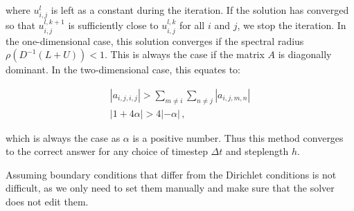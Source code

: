 \documentclass[reprint,english,notitlepage]{revtex4-1}  %
\begin{document}
where $u_{i,j}^l$ is left as a constant during the iteration. If the solution has converged so that $u_{i,j}^{l,k+1}$ is sufficiently close to $u_{i,j}^{l,k}$ for all $i$ and $j$, we stop the iteration. In the one-dimensional case, this solution converges if the spectral radius $\rho(D^{-1}(L+U)) < 1$. This is always the case if the matrix $A$ is diagonally dominant. In the two-dimensional case, this equates to:

\begin{align*}
|a_{i,j,i,j}| > \sum\limits_{m\neq i} \sum\limits_{n\neq j} |a_{i,j,m,n}| \\
|1 + 4 \alpha| > 4|-\alpha| \, ,
\end{align*}

which is always the case as $\alpha$ is a positive number. Thus this method converges to the correct answer for any choice of timestep $\Delta t$ and steplength $h$.

Assuming boundary conditions that differ from the Dirichlet conditions is not difficult, as we only need to set them manually and make sure that the solver does not edit them. 





\end{document}

